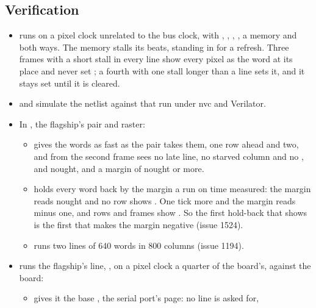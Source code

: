 \subsection*{Verification}

\begin{itemize}
\item {} runs  on a pixel clock
unrelated to the bus clock, with , ,
, , a memory and  both ways.
The memory stalls its beats, standing in for a refresh. Three frames
with a short stall in every line show every pixel as the word at its
place and never set ; a fourth with one stall longer than
a line sets it, and it stays set until it is cleared.
\item {} and
 simulate the netlist
against that run under nvc and Verilator.
\item In , the flagship's pair and
raster:
\begin{itemize}
\item {}
gives the words as fast as the pair takes them, one row ahead and two,
and from the second frame sees no late line, no starved column and no
,  and  nought, and a
margin of nought or more.
\item {}\allowbreak
{} holds every word back by the margin a run on time
measured: the margin reads nought and no row shows . One
tick more and the margin reads minus one, and rows and frames show
. So the first hold-back that shows  is the first
that makes the margin negative (issue 1524).
\item {}
runs two lines of 640 words in 800 columns (issue 1194).
\end{itemize}
\item {} runs the flagship's line,
, on a pixel clock a
quarter of the board's, against the board:
\begin{itemize}
\item {} gives it
the base , the serial port's page: no line is asked for,

\end{itemize}
\end{itemize}
